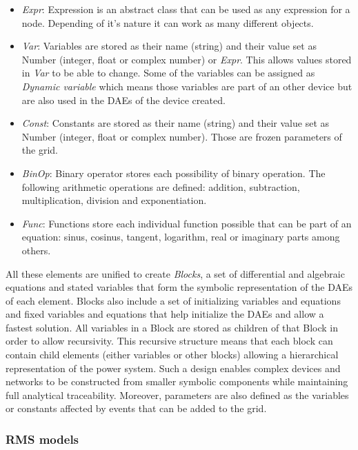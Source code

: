 \begin{itemize}
  \item \textit{Expr}: Expression is an abstract class that can be used as any expression for a node. Depending of it's nature it can work as many different objects.
  \item \textit{Var}: Variables are stored as their name (string) and their value set as Number (integer, float or complex number) or \textit{Expr}. This allows values stored in
  \textit{Var} to be able to change. Some of the variables can be assigned as \textit{Dynamic variable} which means those variables are part of an other device but are also used in
  the DAEs of the device created.
  \item \textit{Const}: Constants are stored as their name (string) and their value set as Number (integer, float or complex number). Those are frozen parameters of the grid.
  \item \textit{BinOp}: Binary operator stores each possibility of binary operation. The following arithmetic operations are defined: addition, subtraction, multiplication, division and exponentiation.
  \item \textit{Func}: Functions store each individual function possible that can be part of an equation: sinus, cosinus, tangent, logarithm, real or imaginary parts among others.
\end{itemize}

All these elements are unified to create \textit{Blocks}, a set of differential and algebraic equations and stated variables that form the symbolic representation of the DAEs of each
element. Blocks also include a set of initializing variables and equations and fixed variables and equations that help initialize the DAEs and allow a fastest solution. All variables in a Block are stored as 
children of that Block in order to allow recursivity. This recursive structure means that each block can contain child elements (either variables or 
other blocks) allowing a hierarchical representation of the power system. Such a design enables complex devices and networks to be constructed from smaller symbolic components 
while maintaining full analytical traceability. Moreover, parameters are also defined as the variables or constants affected by events that can be added to the grid.

\subsubsection{RMS models}

